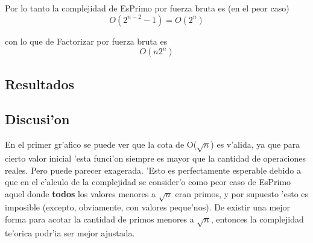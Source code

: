 Por lo tanto la complejidad de EsPrimo por fuerza bruta es (en el peor caso)
$$O(2^{n-2}-1) = O(2^n)$$

con lo que de Factorizar por fuerza bruta es
$$O(n2^n)$$



\clearpage
\subsection{Resultados}
\clearpage


\subsection{Discusi'on}
En el primer gr'afico se puede ver que la cota de O($\sqrt{n}$) es v'alida, ya que para cierto valor inicial 'esta funci'on siempre es mayor que la cantidad de operaciones reales. Pero puede parecer exagerada. 'Esto es perfectamente esperable debido a que en el c'alculo de la complejidad se consider'o como peor caso de EsPrimo aquel donde {\bf todos} los valores menores a $\sqrt{n}$ eran primos, y por supuesto 'esto es imposible (excepto, obviamente, con valores peque'nos). De existir una mejor forma para acotar la cantidad de primos menores a $\sqrt{n}$, entonces la complejidad te'orica podr'ia ser mejor ajustada.

